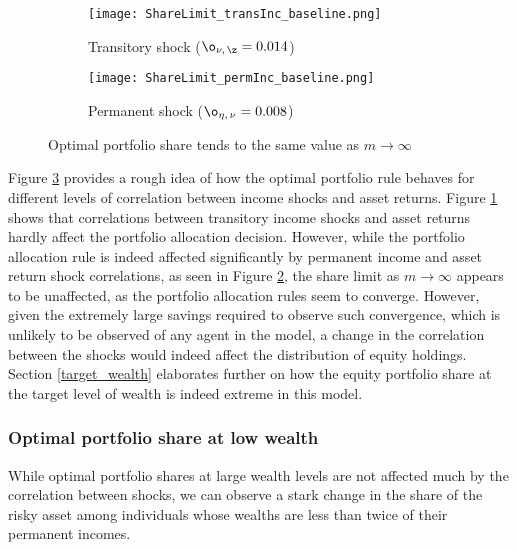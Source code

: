 \begin{figure}[h]
    \centering
    \begin{subfigure}{0.49\textwidth}
        \centering
        \texttt{[image: ShareLimit\_transInc\_baseline.png]}
        \caption{Transitory shock ($\o_{\nu,\,\z} = 0.014$)}
        \label{subfig:shareLimit_baseline_transitory}
    \end{subfigure}
    \begin{subfigure}{0.49\textwidth}
        \centering
        \texttt{[image: ShareLimit\_permInc\_baseline.png]}
        \caption{Permanent shock ($\o_{\eta,\,\nu} = 0.008$)}
        \label{subfig:shareLimit_baseline_permanent}
    \end{subfigure}
    \caption{Optimal portfolio share tends to the same value as $m\to \infty$}
    \label{fig:shareLimit_baseline}
\end{figure}

Figure \ref{fig:shareLimit_baseline} provides a rough idea of how the optimal portfolio rule behaves for different levels of correlation between income shocks and asset returns. Figure \ref{subfig:shareLimit_baseline_transitory} shows that correlations between transitory income shocks and asset returns hardly affect the portfolio allocation decision. However, while the portfolio allocation rule is indeed affected significantly by permanent income and asset return shock correlations, as seen in Figure \ref{subfig:shareLimit_baseline_permanent}, the share limit as $m \to \infty$ appears to be unaffected, as the portfolio allocation rules seem to converge. However, given the extremely large savings required to observe such convergence, which is unlikely to be observed of any agent in the model, a change in the correlation between the shocks would indeed affect the distribution of equity holdings. Section \ref{target_wealth} elaborates further on how the equity portfolio share at the target level of wealth is indeed extreme in this model.

\subsubsection{Optimal portfolio share at low wealth}\label{portfolio_low_wealth}

While optimal portfolio shares at large wealth levels are not affected much by the correlation between shocks, we can observe a stark change in the share of the risky asset among individuals whose wealths are less than twice of their permanent incomes.

